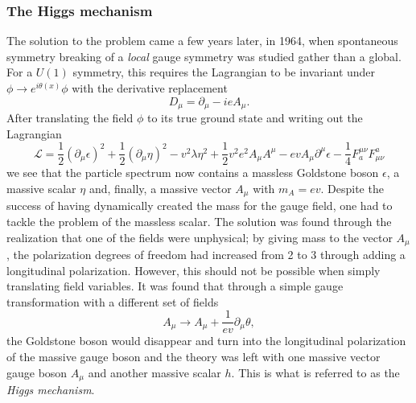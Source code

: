 \subsubsection{The Higgs mechanism}
The solution to the problem came a few years later, in 1964, when spontaneous symmetry breaking of a \emph{local} gauge symmetry was studied gather than a global. For a $U(1)$ symmetry, this requires the Lagrangian to be invariant under $\phi \rightarrow e^{i\theta(x)}\phi$ with the derivative replacement
\begin{equation}
D_{\mu}=\partial_{\mu}-ie A_{\mu}.
\end{equation}
After translating the field $\phi$ to its true ground state and writing out the Lagrangian
\begin{equation}
  \label{eq:theory:higgsL}
\mathcal{L} = \frac{1}{2}(\partial_{\mu}\epsilon)^2 + \frac{1}{2}(\partial_{\mu}\eta)^2-v^2\lambda \eta^2+\frac{1}{2}v^2 e^2 A_{\mu} A^{\mu}-ev A_{\mu}\partial^{\mu}\epsilon-\frac{1}{4}F_{a}^{\mu\nu}F^{a}_{\mu\nu}
\end{equation}
we see that the particle spectrum now contains a massless Goldstone boson $\epsilon$, a massive scalar $\eta$ and, finally, a massive vector $A_{\mu}$ with $m_A=ev$. Despite the success of having dynamically created the mass for the gauge field, one had to tackle the problem of the massless scalar. The solution was found through the realization that one of the fields were unphysical; by giving mass to the vector $A_{\mu}$, the polarization degrees of freedom had increased from 2 to 3 through adding a longitudinal polarization. However, this should not be possible when simply translating field variables. It was found that through a simple gauge transformation with a different set of fields
\begin{equation}
A_{\mu} \rightarrow A_{\mu}+\frac{1}{ev}\partial_{\mu}\theta,
\end{equation}
the Goldstone boson would disappear and turn into the longitudinal polarization of the massive gauge boson and the theory was left with one massive vector gauge boson $A_{\mu}$ and another massive scalar $h$. This is what is referred to as the \emph{Higgs mechanism}.

